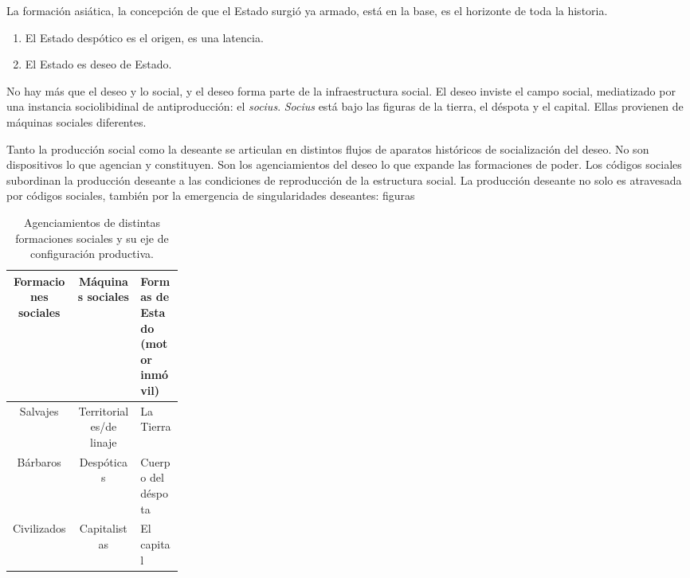 La formación asiática, la concepción de que el Estado surgió ya armado, está en la base, es el horizonte de toda la historia.

\begin{enumerate}[labelindent=\parindent, leftmargin=*, label=\roman*., widest=ii, align=left]
  \item El Estado despótico es el origen, es una latencia.
  \item El Estado es deseo de Estado.
\end{enumerate}

No hay más que el deseo y lo social, y el deseo forma parte de la infraestructura social. El deseo inviste el campo social, mediatizado por una instancia sociolibidinal de antiproducción: el \emph{socius}. \emph{Socius} está bajo las figuras de la tierra, el déspota y el capital. Ellas provienen de máquinas sociales diferentes.

Tanto la producción social como la deseante se articulan en distintos flujos de aparatos históricos de socialización del deseo. No son dispositivos lo que agencian y constituyen. Son los agenciamientos del deseo lo que expande las formaciones de poder. Los códigos sociales subordinan la producción deseante a las condiciones de reproducción de la estructura social. La producción deseante no solo es atravesada por códigos sociales, también por la emergencia de singularidades deseantes: figuras 

\begin{table}[htb]
  \caption{Agenciamientos de distintas formaciones sociales y su eje de configuración productiva.} %
  \label{tab:tablename}
  \centering
  \begin{tabular}{ccp{0.25\linewidth}}
    \toprule
    \textbf{Formaciones sociales} & \textbf{Máquinas sociales} & \textbf{Formas de Estado (motor inmóvil)}\\
    \midrule
    Salvajes & Territoriales/de linaje & La Tierra\\
    Bárbaros & Despóticas & Cuerpo del déspota\\
    Civilizados & Capitalistas & El capital\\
    \bottomrule
  \end{tabular}
\end{table}

